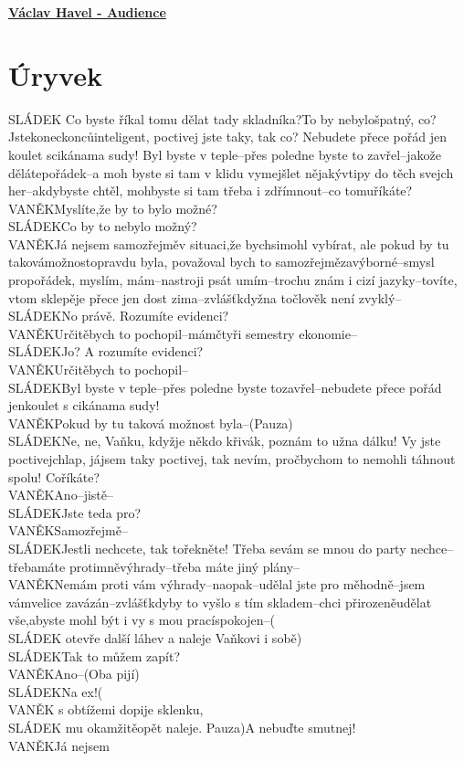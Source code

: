 \documentclass[11pt]{article}
\begin{document}
    \begin{center}
        \underline{\textbf{\Huge Václav Havel - Audience}}
    \end{center}
    \section*{Úryvek}
    SLÁDEK Co byste říkal tomu dělat tady skladníka?To by  nebylošpatný,  co?  Jstekoneckoncůinteligent, poctivej  jste  taky,  tak co? Nebudete  přece  pořád jen  koulet  scikánama  sudy!  Byl  byste  v  teple–přes  poledne  byste  to  zavřel–jakože  dělátepořádek–a  moh byste  si  tam v klidu  vymejšlet  nějakývtipy do těch  svejch her–akdybyste chtěl, mohbyste si tam třeba i zdřímnout–co tomuříkáte?\\ VANĚKMyslíte,že by to bylo možné?\\ SLÁDEKCo by to nebylo možný?\\ VANĚKJá nejsem samozřejměv situaci,že bychsimohl vybírat, ale pokud by tu takovámožnostopravdu  byla,  považoval  bych  to  samozřejmězavýborné–smysl  propořádek, myslím, mám–nastroji psát umím–trochu znám i cizí jazyky–tovíte, vtom sklepěje přece jen dost zima–zvlášťkdyžna točlověk není zvyklý–\\ SLÁDEKNo právě. Rozumíte evidenci?\\ VANĚKUrčitěbych to pochopil–mámčtyři semestry ekonomie–\\ SLÁDEKJo? A rozumíte evidenci?\\ VANĚKUrčitěbych to pochopil–\\ SLÁDEKByl  byste  v  teple–přes  poledne  byste  tozavřel–nebudete  přece  pořád  jenkoulet s cikánama sudy!\\ VANĚKPokud by tu taková možnost byla–(Pauza)\\ SLÁDEKNe,  ne,  Vaňku,  kdyžje  někdo  křivák,  poznám  to  užna  dálku!  Vy  jste  poctivejchlap,  jájsem  taky  poctivej,  tak  nevím,  pročbychom  to  nemohli  táhnout  spolu!  Coříkáte?\\ VANĚKAno–jistě–\\ SLÁDEKJste teda pro?\\ VANĚKSamozřejmě–\\ SLÁDEKJestli nechcete, tak tořekněte! Třeba sevám se mnou do party nechce–třebamáte protimněvýhrady–třeba máte jiný plány–\\ VANĚKNemám  proti  vám  výhrady–naopak–udělal  jste  pro  měhodně–jsem  vámvelice  zavázán–zvlášťkdyby  to  vyšlo  s  tím  skladem–chci  přirozeněudělat  vše,abyste mohl být i vy s mou pracíspokojen–(\\ SLÁDEK otevře další láhev a naleje Vaňkovi i sobě)\\ SLÁDEKTak to můžem zapít?\\ VANĚKAno–(Oba pijí)\\ SLÁDEKNa ex!(\\ VANĚK s obtížemi dopije sklenku, \\ SLÁDEK mu okamžitěopět naleje. Pauza)A nebuďte smutnej!\\ VANĚKJá nejsem 
\end{document}
